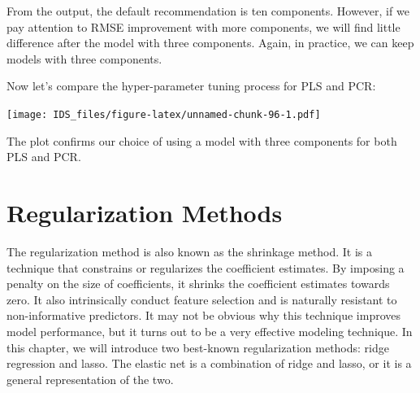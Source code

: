 \documentclass[
  12pt,
]{krantz}
\makeatletter
\newenvironment{Shaded}{\begin{snugshade}}{\end{snugshade}}
\newcommand{\AttributeTok}[1]{\textcolor[rgb]{0.61,0.61,0.61}{#1}}
\newcommand{\CommentTok}[1]{\textcolor[rgb]{0.37,0.37,0.37}{\textit{#1}}}
\newcommand{\DecValTok}[1]{\textcolor[rgb]{0.06,0.06,0.06}{#1}}
\newcommand{\FunctionTok}[1]{\textcolor[rgb]{0,0,0}{#1}}
\newcommand{\NormalTok}[1]{#1}
\newcommand{\OtherTok}[1]{\textcolor[rgb]{0.37,0.37,0.37}{#1}}
\newcommand{\SpecialCharTok}[1]{\textcolor[rgb]{0,0,0}{#1}}
\newcommand{\StringTok}[1]{\textcolor[rgb]{0.5,0.5,0.5}{#1}}
\newenvironment{kframe}{%
\medskip{}
\setlength{\fboxsep}{.8em}
 \def\at@end@of@kframe{}%
 \ifinner\ifhmode%
  \def\at@end@of@kframe{\end{minipage}}%
  \begin{minipage}{\columnwidth}%
 \fi\fi%
 \def\FrameCommand##1{\hskip\@totalleftmargin \hskip-\fboxsep
 \colorbox{shadecolor}{##1}\hskip-\fboxsep
     \hskip-\linewidth \hskip-\@totalleftmargin \hskip\columnwidth}%
 \MakeFramed {\advance\hsize-\width
   \@totalleftmargin\z@ \linewidth\hsize
   \@setminipage}}%
 {\par\unskip\endMakeFramed%
 \at@end@of@kframe}
\renewenvironment{Shaded}{\begin{kframe}}{\end{kframe}}
\makeatother
\begin{document}
From the output, the default recommendation is ten components. However, if we pay attention to RMSE improvement with more components, we will find little difference after the model with three components. Again, in practice, we can keep models with three components.

Now let's compare the hyper-parameter tuning process for PLS and PCR:

\begin{Shaded}
\end{Shaded}

\texttt{[image: IDS\_files/figure-latex/unnamed-chunk-96-1.pdf]}

The plot confirms our choice of using a model with three components for both PLS and PCR.

\hypertarget{regularization-methods}{%
\chapter{Regularization Methods}\label{regularization-methods}}

The regularization method is also known as the shrinkage method. It is a technique that constrains or regularizes the coefficient estimates. By imposing a penalty on the size of coefficients, it shrinks the coefficient estimates towards zero. It also intrinsically conduct feature selection and is naturally resistant to non-informative predictors. It may not be obvious why this technique improves model performance, but it turns out to be a very effective modeling technique. In this chapter, we will introduce two best-known regularization methods: ridge regression and lasso. The elastic net is a combination of ridge and lasso, or it is a general representation of the two.
\end{document}

